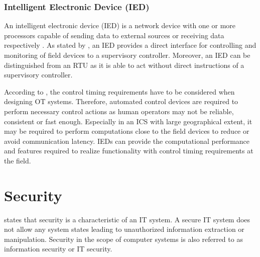 \subsubsection{Intelligent Electronic Device (IED)}
An intelligent electronic device (IED) is a network device with one or more processors capable of sending data to external sources or receiving data respectively \cite{aga2006}.
As stated by \citeauthor{Stouffer2023} \cite{Stouffer2023}, an IED provides a direct interface for controlling and monitoring of field devices to a supervisory controller.
Moreover, an IED can be distinguished from an RTU as it is able to act without direct instructions of a supervisory controller.

According to \citeauthor{Stouffer2023}, the control timing requirements have to be considered when designing OT systems.
Therefore, automated control devices are required to perform necessary control actions as human operators may not be reliable, consistent or fast enough.
Especially in an ICS with large geographical extent, it may be required to perform computations close to the field devices to reduce or avoid communication latency.
IEDs can provide the computational performance and features required to realize functionality with control timing requirements at the field.


\section{Security}
\label{sec:security}
\citeauthor{Eckert2023} \cite{Eckert2023} states that security is a characteristic of an IT system.
A secure IT system does not allow any system states leading to unauthorized information extraction or manipulation.
Security in the scope of computer systems is also referred to as information security or IT security.

